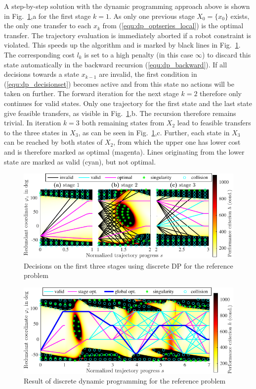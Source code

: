 \documentclass[runningheads]{llncs}
\begin{document}
A step-by-step solution with the dynamic programming approach above is shown in Fig.~\ref{fig:dp_example_stage1},a for the first stage $k=1$.
As only one previous stage $X_0=\{x_0\}$ exists, the only one transfer to each $x_k$ from (\ref{equ:dp_optseries_local}) is the optimal transfer.
The trajectory evaluation is immediately aborted if a robot constraint is violated.
This speeds up the algorithm and is marked by black lines in Fig.~\ref{fig:dp_example_stage1}.
The corresponding cost $l_k$ is set to a high penalty (in this case $\infty$) to discard this state automatically in the backward recursion (\ref{equ:dp_backward}).
If all decisions towards a state $x_{k-1}$ are invalid, the first condition in (\ref{equ:dp_decisionset}) becomes active and from this state no actions will be taken on further.
The forward iteration for the next stage $k=2$ therefore only continues for valid states.
Only one trajectory for the first state and the last state give feasible transfers, as visible in Fig.~\ref{fig:dp_example_stage1},b.
The recursion therefore remains trivial.
In iteration $k=3$ both remaining states from $X_2$ lead to feasible transfers to the three states in $X_3$, as can be seen in Fig.~\ref{fig:dp_example_stage1},c.
Further, each state in $X_3$ can be reached by both states of $X_2$, from which the upper one has lower cost and is therefore marked as optimal (magenta).
Lines originating from the lower state are marked as valid (cyan), but not optimal.


\begin{figure}[tb]
\centering
\includegraphics{dp_discr_stage1_to_3_compressed.pdf}
\caption{Decisions on the first three stages using discrete DP for the reference problem}
\label{fig:dp_example_stage1}
\end{figure}


\begin{figure}[tb]
\centering
\includegraphics{dp_discr_result_compressed.pdf}
\caption{Result of discrete dynamic programming for the reference problem}
\label{fig:dp_example_all}
\end{figure}
\end{document}
